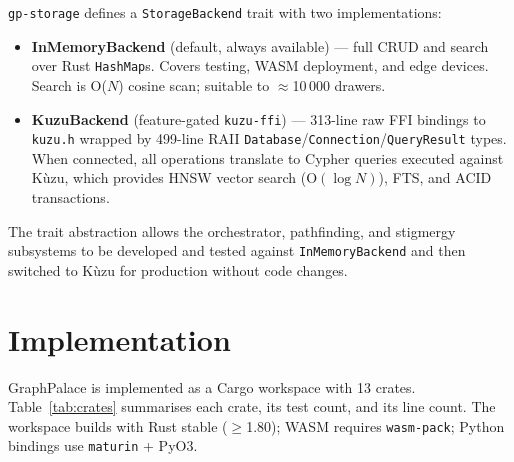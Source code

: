 \documentclass[11pt,a4paper]{article}
\begin{document}
\texttt{gp-storage} defines a \texttt{StorageBackend} trait with two
implementations:

\begin{itemize}[nosep]
\item \textbf{InMemoryBackend} (default, always available) --- full CRUD and
      search over Rust \texttt{HashMap}s.  Covers testing, WASM deployment,
      and edge devices.  Search is O($N$) cosine scan; suitable to
      $\approx$10\,000 drawers.
\item \textbf{KuzuBackend} (feature-gated \texttt{kuzu-ffi}) --- 313-line raw
      FFI bindings to \texttt{kuzu.h} wrapped by 499-line RAII
      \texttt{Database}/\texttt{Connection}/\texttt{QueryResult} types.
      When connected, all operations translate to Cypher queries executed
      against Kùzu, which provides HNSW vector search (O$(\log N)$), FTS, and
      ACID transactions.
\end{itemize}

The trait abstraction allows the orchestrator, pathfinding, and stigmergy
subsystems to be developed and tested against \texttt{InMemoryBackend} and then
switched to Kùzu for production without code changes.

\section{Implementation}
\label{sec:impl}

GraphPalace is implemented as a Cargo workspace with 13 crates.
Table~\ref{tab:crates} summarises each crate, its test count, and its line
count.  The workspace builds with Rust stable ($\geq$1.80); WASM requires
\texttt{wasm-pack}; Python bindings use \texttt{maturin} + PyO3.
\end{document}
